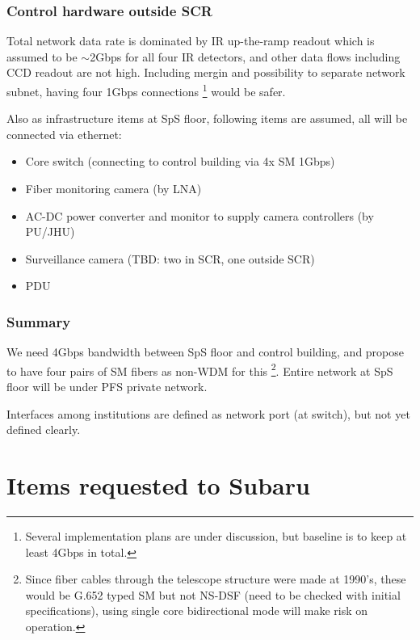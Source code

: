 \documentclass[a4paper,notitlepage]{article}
\begin{document}
\subsubsection{Control hardware outside SCR}

Total network data rate is dominated by IR up-the-ramp readout which 
is assumed to be $\sim$2Gbps for all four IR detectors, and other data flows 
including CCD readout are not high. 
Including mergin and possibility to separate network subnet, having four 1Gbps 
connections
\footnote{Several implementation plans are under discussion, but baseline is 
to keep at least 4Gbps in total. } 
would be safer. 

Also as infrastructure items at SpS floor, following items are assumed, 
all will be connected via ethernet: 

\begin{itemize}
  \item Core switch (connecting to control building via 4x SM 1Gbps)
  \item Fiber monitoring camera (by LNA)
  \item AC-DC power converter and monitor to supply camera controllers
    (by PU/JHU)
  \item Surveillance camera (TBD: two in SCR, one outside SCR)
  \item PDU
\end{itemize}


\subsubsection{Summary}

We need 4Gbps bandwidth between SpS floor and control building, and 
propose to have four pairs of SM fibers as non-WDM for this
\footnote{Since fiber cables through the telescope structure were made 
at 1990's, these would be G.652 typed SM but not NS-DSF (need to be checked 
with initial specifications), using single core bidirectional mode will 
make risk on operation.}. 
Entire network at SpS floor will be under PFS private network. 

Interfaces among institutions are defined as network port (at switch), 
but not yet defined clearly. 

\section{Items requested to Subaru}
\end{document}
